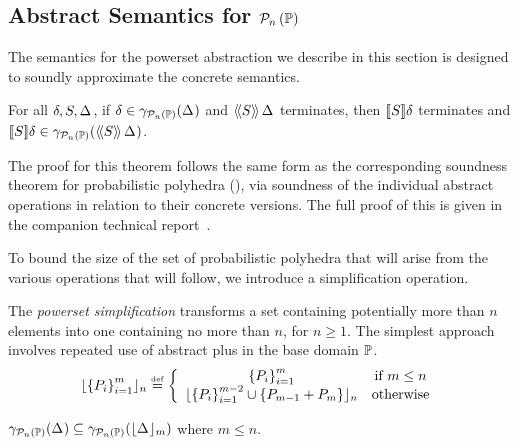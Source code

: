 
\subsection{Abstract Semantics for $\mathcal{P}_{n}\left( \mathbb{P} \right)$} \label{sec:powerset}
The semantics for the powerset abstraction we describe in this section
is designed to soundly approximate the concrete semantics. 

\begin{theorem} \label{thm:ppp:soundness}
For all $\delta, S, \Delta_{}$, if $\delta \in \gamma_{\mathcal{P}_{n}\left( \mathbb{P} \right)}(\Delta_{})$ and $
\langle\!\langle{S}\rangle\!\rangle\,{\Delta_{}} $ terminates, then $ [\![{S}]\!]{\delta} $ terminates and
$[\![{S}]\!]{\delta} \in
\gamma_{\mathcal{P}_{n}\left( \mathbb{P} \right)}(\langle\!\langle{S}\rangle\!\rangle\,{\Delta_{}})$.
\end{theorem}

The proof for this theorem follows the same form as the corresponding
soundness theorem for probabilistic polyhedra
(), via soundness of the individual abstract
operations in relation to their concrete versions. The full proof of
this is given in the companion technical
report~\cite{TR}.

To bound the size of the set of probabilistic polyhedra that
will arise from the various operations that will follow, we introduce a
simplification operation.

\begin{definition}
\label{def:ppp-simp}
The \emph{powerset simplification} transforms a
  set containing potentially more than $ n $ elements into one
  containing no more than $ n $, for $n \geq 1$. The simplest approach involves repeated use
  of abstract plus in the base domain $ \mathbb{P} $.
$$
\lfloor \left\{ P_{i} \right\}_{i=1}^{m} \rfloor_{n} \stackrel{\smash{\scriptscriptstyle \mathrm{def}}}= \left\{
\begin{array}{cc}
\left\{ P_{i} \right\}_{i=1}^{m} & \text{if } m \leq n \\
\lfloor \left\{ P_{i} \right\}_{i=1}^{m-2} \cup \left\{ P_{m-1} + P_{m} \right\} \rfloor_{n} & \text{otherwise} \\
\end{array}
\right.
$$
\end{definition}

\begin{lemma}
\label{lem:ppp:bound}
$ \gamma_{\mathcal{P}_{n}\left( \mathbb{P} \right)}(\Delta_{}) \subseteq \gamma_{\mathcal{P}_{n}\left( \mathbb{P} \right)}(
    \lfloor \Delta_{} \rfloor_{m}) $ where $m \leq n$.
\end{lemma}

